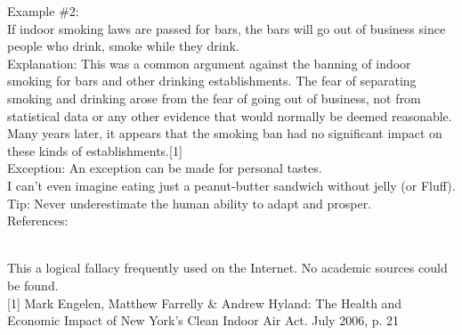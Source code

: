 \documentclass[a4paper,12pt,single,pdftex]{scrbook}
\begin{document}
    
      Example \#2:
    \\

    
      If indoor smoking laws are passed for bars, the bars will go out of business since people who drink, smoke while they drink.
    \\

    
      Explanation: This was a common argument against the banning of indoor smoking for bars and other drinking establishments.  The fear of separating smoking and drinking arose from the fear of going out of business, not from statistical data or any other evidence that would normally be deemed reasonable.  Many years later, it appears that the smoking ban had no significant impact on these kinds of establishments.[1]
    \\

    
      Exception: An exception can be made for personal tastes.
    \\

    
      I can’t even imagine eating just a peanut-butter sandwich without jelly (or Fluff).
    \\

    
      Tip: Never underestimate the human ability to adapt and prosper.
    \\

    References:

    
      
        
      \\

      
        This a logical fallacy frequently used on the Internet. No academic sources could be found.
      \\

      
        [1] Mark Engelen, Matthew Farrelly \& Andrew Hyland: The Health and Economic Impact of New York's Clean Indoor Air Act. July 2006, p. 21
      \\

    
\end{document}
